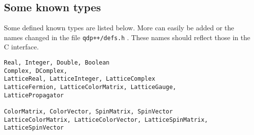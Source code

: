 \documentclass[12pt,letterpaper]{article}
\begin{document}
\subsection{Some known types}
Some defined known types are listed below. More can easily be added or the
names changed in the file {\tt qdp++/defs.h} .
These names should reflect those in the C interface.

\begin{verbatim}
Real, Integer, Double, Boolean
Complex, DComplex,
LatticeReal, LatticeInteger, LatticeComplex
LatticeFermion, LatticeColorMatrix, LatticeGauge,
LatticePropagator

ColorMatrix, ColorVector, SpinMatrix, SpinVector
LatticeColorMatrix, LatticeColorVector, LatticeSpinMatrix, LatticeSpinVector
\end{verbatim}
\end{document}
